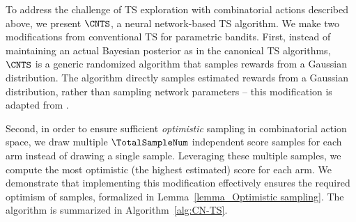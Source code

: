 \documentclass{article}
\theoremstyle{plain}
\begin{document}
To address the challenge of TS exploration with combinatorial actions described above,
we present $\CNTS$, a neural network-based TS algorithm. We make two modifications from conventional TS for parametric bandits.
First, instead of maintaining an actual Bayesian posterior as in the canonical TS algorithms, 
$\CNTS$ is a generic randomized algorithm that 
samples rewards from a Gaussian distribution. 
The algorithm directly samples  estimated rewards from a Gaussian distribution, rather than sampling network parameters -- this modification is adapted from \citet{zhang2021neural}. 

Second, in order to ensure sufficient \textit{optimistic} sampling in combinatorial action space, we draw multiple $\TotalSampleNum$ independent score samples for each arm instead of drawing a single sample. 
Leveraging these multiple samples, we compute the most optimistic (the highest estimated) score for each arm. We demonstrate that implementing this modification effectively ensures the required optimism of samples, formalized in  Lemma~\ref{lemma_Optimistic sampling}.
The algorithm is summarized in Algorithm~\ref{alg:CN-TS}.
%


\end{document}
